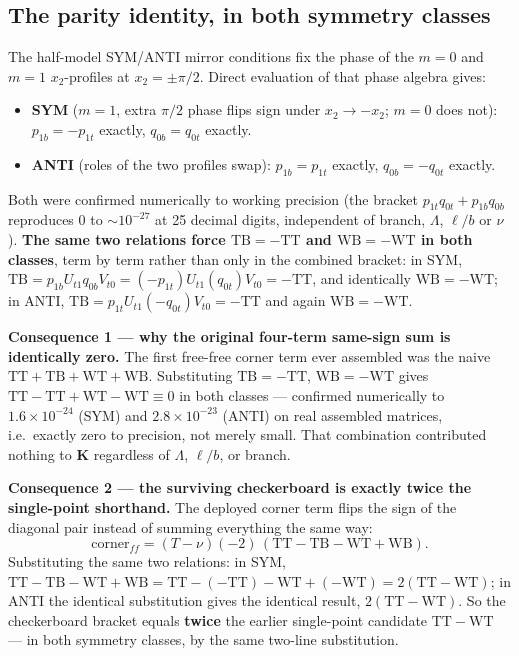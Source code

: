 \documentclass[11pt]{article}
\begin{document}
\subsection{The parity identity, in both symmetry classes}\label{sec:sm-parity}
The half-model SYM/ANTI mirror conditions fix the phase of the $m=0$ and
$m=1$ $x_2$-profiles at $x_2=\pm\pi/2$. Direct evaluation of that phase
algebra gives:
\begin{itemize}\itemsep2pt
\item \textbf{SYM} ($m=1$, extra $\pi/2$ phase flips sign under
$x_2\to-x_2$; $m=0$ does not): $p_{1b}=-p_{1t}$ exactly,
$q_{0b}=q_{0t}$ exactly.
\item \textbf{ANTI} (roles of the two profiles swap): $p_{1b}=p_{1t}$
exactly, $q_{0b}=-q_{0t}$ exactly.
\end{itemize}
Both were confirmed numerically to working precision (the bracket
$p_{1t}q_{0t}+p_{1b}q_{0b}$ reproduces $0$ to ${\sim}10^{-27}$ at
25 decimal digits, independent of branch, $\Lambda$, $\ell/b$ or $\nu$).
\textbf{The same two relations force $\mathrm{TB}=-\mathrm{TT}$ and
$\mathrm{WB}=-\mathrm{WT}$ in both classes}, term by term rather than
only in the combined bracket: in SYM,
$\mathrm{TB}=p_{1b}U_{t1}q_{0b}V_{t0}=(-p_{1t})U_{t1}(q_{0t})V_{t0}=-\mathrm{TT}$,
and identically $\mathrm{WB}=-\mathrm{WT}$; in ANTI,
$\mathrm{TB}=p_{1t}U_{t1}(-q_{0t})V_{t0}=-\mathrm{TT}$ and again
$\mathrm{WB}=-\mathrm{WT}$.

\textbf{Consequence 1 --- why the original four-term same-sign sum is
identically zero.} The first free-free corner term ever assembled was the
naive $\mathrm{TT}+\mathrm{TB}+\mathrm{WT}+\mathrm{WB}$. Substituting
$\mathrm{TB}=-\mathrm{TT}$, $\mathrm{WB}=-\mathrm{WT}$ gives
$\mathrm{TT}-\mathrm{TT}+\mathrm{WT}-\mathrm{WT}\equiv 0$ in both
classes --- confirmed numerically to $1.6\times 10^{-24}$ (SYM) and
$2.8\times 10^{-23}$ (ANTI) on real assembled matrices, i.e.\ exactly
zero to precision, not merely small. That combination contributed
nothing to $\mathbf{K}$ regardless of $\Lambda$, $\ell/b$, or branch.

\textbf{Consequence 2 --- the surviving checkerboard is exactly twice the
single-point shorthand.} The deployed corner term flips the sign of the
diagonal pair instead of summing everything the same way:
\begin{equation}
\mathrm{corner}_{ff} = (T-\nu)(-2)\,(\mathrm{TT}-\mathrm{TB}-\mathrm{WT}+\mathrm{WB}).
\label{eq:sm-checkerboard}
\end{equation}
Substituting the same two relations: in SYM,
$\mathrm{TT}-\mathrm{TB}-\mathrm{WT}+\mathrm{WB}
=\mathrm{TT}-(-\mathrm{TT})-\mathrm{WT}+(-\mathrm{WT})
=2(\mathrm{TT}-\mathrm{WT})$; in ANTI the identical substitution gives
the identical result, $2(\mathrm{TT}-\mathrm{WT})$. So the checkerboard
bracket equals \textbf{twice} the earlier single-point candidate
$\mathrm{TT}-\mathrm{WT}$ --- in both symmetry classes, by the same
two-line substitution.
\end{document}
